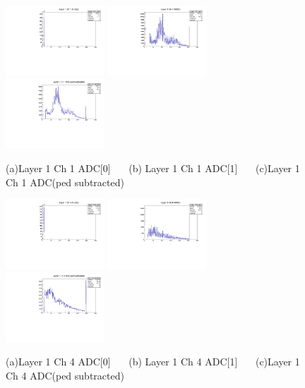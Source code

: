 \documentclass[a4paper,11pt]{article}
\theoremstyle{mytheor}
\begin{document}
\begin{figure}[H] 
\vspace*{-0.3cm} 
\includegraphics[width=0.33\textwidth,scale=0.5,trim=0 0 0 0,clip]{plotsdir/file0_test-Layer1_Ch1_adc0-1.pdf} 
\includegraphics[width=0.33\textwidth,scale=0.5,trim=0 0 0 0,clip]{plotsdir/file0_test-Layer1_Ch1_adc1-1.pdf} 
\includegraphics[width=0.33\textwidth,scale=0.5,trim=0 0 0 0,clip]{plotsdir/file0_test-Layer1_Ch1_adcPedsub-1.pdf} 
\caption{(a)Layer 1 Ch 1 ADC[0] ~~~(b) Layer 1 Ch 1 ADC[1] ~~~(c)Layer 1 Ch 1 ADC(ped subtracted) } 
\end{figure} 
\begin{figure}[H] 
\vspace*{-0.3cm} 
\includegraphics[width=0.33\textwidth,scale=0.5,trim=0 0 0 0,clip]{plotsdir/file0_test-Layer1_Ch4_adc0-1.pdf} 
\includegraphics[width=0.33\textwidth,scale=0.5,trim=0 0 0 0,clip]{plotsdir/file0_test-Layer1_Ch4_adc1-1.pdf} 
\includegraphics[width=0.33\textwidth,scale=0.5,trim=0 0 0 0,clip]{plotsdir/file0_test-Layer1_Ch4_adcPedsub-1.pdf} 
\caption{(a)Layer 1 Ch 4 ADC[0] ~~~(b) Layer 1 Ch 4 ADC[1] ~~~(c)Layer 1 Ch 4 ADC(ped subtracted) } 
\end{figure} 
\end{document}
